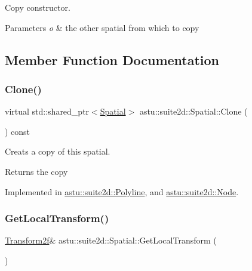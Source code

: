 Copy constructor.


\begin{DoxyParams}{Parameters}
{\em o} & the other spatial from which to copy \\
\hline
\end{DoxyParams}


\subsection{Member Function Documentation}
\mbox{\label{classastu_1_1suite2d_1_1Spatial_a5c058079c94b0e8d7590e70ca2159bd1}} 
\subsubsection{\texorpdfstring{Clone()}{Clone()}}
{\footnotesize\ttfamily virtual std\+::shared\+\_\+ptr$<$\hyperlink{classastu_1_1suite2d_1_1Spatial}{Spatial}$>$ astu\+::suite2d\+::\+Spatial\+::\+Clone (\begin{DoxyParamCaption}{ }\end{DoxyParamCaption}) const\hspace{0.3cm}{\ttfamily [pure virtual]}}

Creats a copy of this spatial.

\begin{DoxyReturn}{Returns}
the copy 
\end{DoxyReturn}


Implemented in \hyperlink{classastu_1_1suite2d_1_1Polyline_acdced9a02e4f789ff04feca46bdb297c}{astu\+::suite2d\+::\+Polyline}, and \hyperlink{classastu_1_1suite2d_1_1Node_a50803fe4a2182ca7320cd2f161873c51}{astu\+::suite2d\+::\+Node}.

\mbox{\label{classastu_1_1suite2d_1_1Spatial_a54e6c7004f30b5cf4fa75dd105c22052}} 
\subsubsection{\texorpdfstring{Get\+Local\+Transform()}{GetLocalTransform()}\hspace{0.1cm}{\footnotesize\ttfamily [1/2]}}
{\footnotesize\ttfamily \hyperlink{group__math__group_gac67b5e9d27308a01ea8190ecb15e08fa}{Transform2f}\& astu\+::suite2d\+::\+Spatial\+::\+Get\+Local\+Transform (\begin{DoxyParamCaption}{ }\end{DoxyParamCaption})\hspace{0.3cm}{\ttfamily [inline]}}

